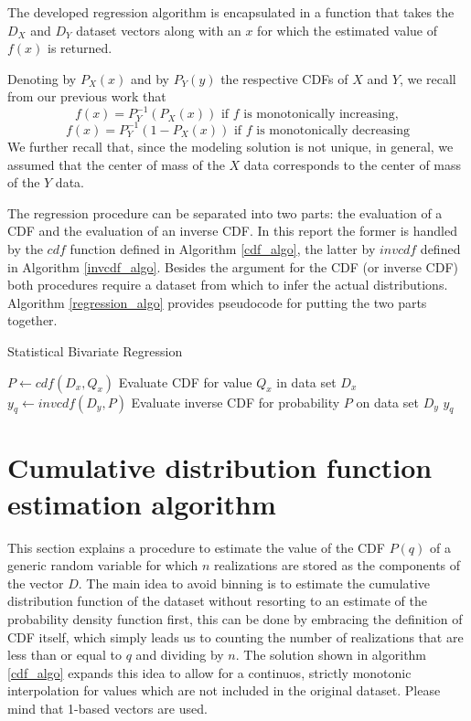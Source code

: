 \documentclass[10pt,final]{siamltex}
\begin{document}
The developed regression algorithm is encapsulated in a function that takes the $D_X$ and $D_Y$ dataset vectors along with an $x$ for which the estimated value of $f(x)$ is returned.

Denoting by $P_X(x)$ and by $P_Y(y)$ the respective CDFs of $X$ and $Y$, we recall from our previous work that
\begin{equation}
  f(x)=P_Y^{-1}(P_X(x)) \text{ if $f$ is monotonically increasing},
\end{equation}
\begin{equation}
  f(x)=P_Y^{-1}(1-P_X(x)) \text{ if $f$ is monotonically decreasing}
\end{equation}
We further recall that, since the modeling solution is not unique, in general, we assumed that the center of mass of the $X$ data corresponds to the center of mass of the $Y$ data.

The regression procedure can be separated into two parts: the evaluation of a CDF and the evaluation of an inverse CDF. In this report the former is handled by the $cdf$ function defined in Algorithm \ref{cdf_algo}, the latter by $invcdf$ defined in Algorithm \ref{invcdf_algo}. Besides the argument for the CDF (or inverse CDF) both procedures require a dataset from which to infer the actual distributions. Algorithm \ref{regression_algo} provides pseudocode for putting the two parts together.

\begin{algorithm}
  \caption{Statistical Bivariate Regression}
  \label{regression_algo}
  \begin{algorithmic}[1]
    \State $P \gets cdf(D_x, Q_x)$
    \Comment Evaluate CDF for value $Q_x$ in data set $D_x$
    \State $y_q \gets invcdf(D_y, P)$
    \Comment Evaluate inverse CDF for probability $P$ on data set $D_y$
    \State \Return $y_q$
    \EndFunction
  \end{algorithmic}
\end{algorithm}

\section{Cumulative distribution function estimation algorithm}
%
This section explains a procedure to estimate the value of the CDF $P(q)$ of a generic random variable for which $n$ realizations are stored as the components of the vector $D$.
The main idea to avoid binning is to estimate the cumulative distribution function of the dataset without resorting to an estimate of the probability density function first, this can be done by embracing the definition of CDF itself, which simply leads us to counting the number of realizations that are less than or equal to $q$ and dividing by $n$. The solution shown in algorithm \ref{cdf_algo} expands this idea to allow for a continuos, strictly monotonic interpolation for values which are not included in the original dataset. Please mind that 1-based vectors are used.
\end{document}
